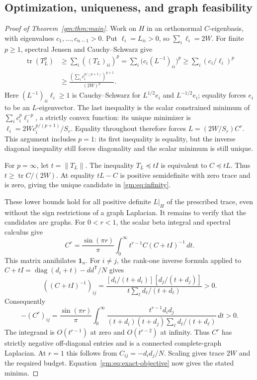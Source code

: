\subsection{Optimization, uniqueness, and graph feasibility}

\begin{proof}[Proof of Theorem~\ref{gm:thm:main}]
Work on $H$ in an orthonormal $C$-eigenbasis, with eigenvalues
$c_1,\ldots,c_{n-1}>0$. Put $\ell_i=L_{ii}>0$, so
$\sum_i\ell_i=2W$. For finite $p\ge1$, spectral Jensen and Cauchy--Schwarz give
\begin{align*}
 \operatorname{tr}(T_L^p)
 &\ge\sum_i ((T_L)_{ii})^p
 =\sum_i\bigl(c_i(L^{-1})_{ii}\bigr)^p
 \ge\sum_i(c_i/\ell_i)^p\\
 &\ge\frac{(\sum_i c_i^{p/(p+1)})^{p+1}}{(2W)^p}.
\end{align*}
Here $(L^{-1})_{ii}\ell_i\ge1$ is Cauchy--Schwarz for
$L^{1/2}e_i$ and $L^{-1/2}e_i$; equality forces $e_i$ to be an
$L$-eigenvector. The last inequality is the scalar constrained minimum of
$\sum_i c_i^p\ell_i^{-p}$, a strictly convex function: its unique minimizer is
$\ell_i=2Wc_i^{p/(p+1)}/S_r$.
Equality throughout therefore forces $L=(2W/S_r)C^r$.
This argument includes $p=1$: its first inequality is equality, but the inverse
diagonal inequality still forces diagonality and the scalar minimum is still
unique.

For $p=\infty$, let $t=\|T_L\|$. The inequality $T_L\preceq tI$
is equivalent to $C\preceq tL$. Thus
$t\ge\operatorname{tr}C/(2W)$. At equality $tL-C$ is positive semidefinite
with zero trace and is zero, giving the unique candidate in
\eqref{gm:eq:infinity}.

These lower bounds hold for all positive definite $L|_H$ of the prescribed
trace, even without the sign restrictions of a graph Laplacian. It remains
to verify that the candidates are graphs. For $0<r<1$, the scalar beta
integral and spectral calculus give
\[
 C^r=\frac{\sin(\pi r)}\pi\int_0^\infty
 t^{r-1}C(C+tI)^{-1}\,dt.
\]
This matrix annihilates $\mathbf1_n$. For $i\ne j$, the rank-one inverse
formula applied to $C+tI=\operatorname{diag}(d_i+t)-dd^{\mathsf T}/N$ gives
\[
 ((C+tI)^{-1})_{ij}=
 \frac{[d_i/(t+d_i)][d_j/(t+d_j)]}
 {t\sum_\ell d_\ell/(t+d_\ell)}>0.
\]
Consequently
\begin{equation}\label{gm:eq:edge-integral}
 -(C^r)_{ij}=\frac{\sin(\pi r)}\pi
 \int_0^\infty
 \frac{t^{r-1}d_id_j}
 {(t+d_i)(t+d_j)\sum_\ell d_\ell/(t+d_\ell)}\,dt>0.
\end{equation}
The integrand is $O(t^{r-1})$ at zero and $O(t^{r-2})$ at infinity.
Thus $C^r$ has strictly negative off-diagonal entries and is a connected
complete-graph Laplacian. At $r=1$ this follows from
$C_{ij}=-d_id_j/N$. Scaling gives trace $2W$ and the required budget.
Equation~\eqref{gm:eq:exact-objective} now gives the stated minima.
\end{proof}

